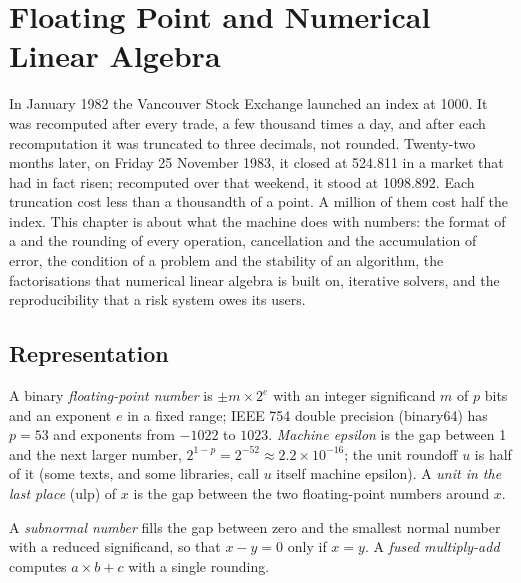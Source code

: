 \chapter{Floating Point and Numerical Linear Algebra}\label{ch:qm:floating-point-and-numerical-linear-algebra}

In January 1982 the Vancouver Stock Exchange launched an index at 1000. It was recomputed after every trade, a few thousand times a day,
and after each recomputation it was truncated to three decimals, not rounded. Twenty-two months later, on Friday 25 November 1983, it closed
at 524.811 in a market that had in fact risen; recomputed over that weekend, it stood at 1098.892. Each truncation cost less than a
thousandth of a point. A million of them cost half the index. This chapter is about what the machine does with numbers: the format of a
 and the rounding of every operation, cancellation and the accumulation of error, the condition of a problem and the
stability of an algorithm, the factorisations that numerical linear algebra is built on, iterative solvers, and the reproducibility that a
risk system owes its users.

\section{Representation}

\begin{definition}\label{def:qm:floating-point-and-numerical-linear-algebra:fp}
A binary \emph{floating-point number} is $\pm m \times 2^e$ with an integer significand $m$ of $p$ bits and an exponent $e$ in a fixed range; IEEE 754
double precision (binary64) has $p = 53$ and exponents from $-1022$ to $1023$. \emph{Machine epsilon} is the gap between 1 and the next larger number, $2^{1-p} =
2^{-52} \approx 2.2 \times 10^{-16}$; the unit roundoff $u$ is half of it (some texts, and some libraries, call $u$ itself machine epsilon). A \emph{unit in the last place} (ulp) of $x$ is the gap between the two floating-point
numbers around $x$.
\end{definition}

\begin{definition}\label{def:qm:floating-point-and-numerical-linear-algebra:fma}
A \emph{subnormal number} fills the gap between zero and the smallest normal number with a reduced significand, so that $x - y = 0$ only if $x = y$. A
\emph{fused multiply-add} computes $a \times b + c$ with a single rounding.
\end{definition}

